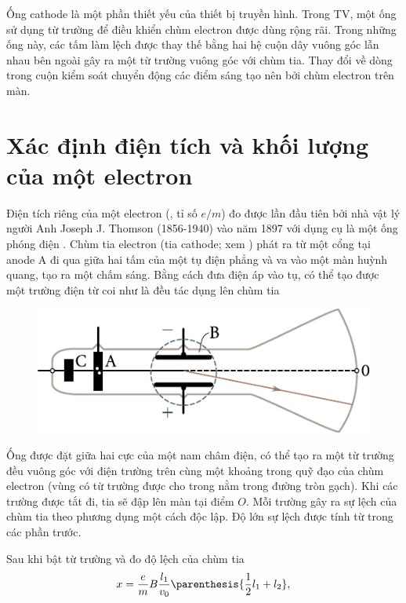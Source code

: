 Ống cathode là một phần thiết yếu của thiết bị truyền hình.
Trong TV, một ống sử dụng từ trường để điều khiển chùm electron được dùng rộng rãi.
Trong những ống này, các tấm làm lệch được thay thế bằng hai hệ cuộn dây vuông góc lẫn nhau bên ngoài gây ra một từ trường vuông góc với chùm tia.
Thay đổi về dòng trong cuộn kiểm soát chuyển động các điểm sáng tạo nên bởi chùm electron trên màn.

\section{Xác định điện tích và khối lượng
của một electron}\label{sec:10_3}

Điện tích riêng của một electron (\ie, tỉ số $e/m$) đo được lần đầu tiên bởi nhà vật lý người Anh Joseph J. Thomson (1856-1940) vào năm 1897 với dụng cụ là một ống phóng điện .
Chùm tia electron (tia cathode; xem ) phát ra từ một cổng tại anode A đi qua giữa hai tấm của một tụ điện phẳng và va vào một màn huỳnh quang, tạo ra một chấm sáng.
Bằng cách đưa điện áp vào tụ, có thể tạo được một trường điện từ coi như là đều tác dụng lên chùm tia

\begin{figure}[t]
	\begin{center}
		\includegraphics[scale=1]{figures/ch_10/fig_10_6.pdf}
		\caption[]{}
		\label{fig:10_6}
	\end{center}
	\vspace{-0.8cm}
\end{figure}

Ống được đặt giữa hai cực của một nam châm điện, có thể tạo ra một từ trường đều vuông góc với điện trường trên cùng một khoảng trong quỹ đạo của chùm electron (vùng có từ trường được cho trong  nằm trong đường tròn gạch).
Khi các trường được tắt đi, tia sẽ đập lên màn tại điểm $O$.
Mỗi trường gây ra sự lệch của chùm tia theo phương dụng một cách độc lập.
Độ lớn sự lệch được tính từ  trong các phần trước.

Sau khi bật từ trường và đo độ lệch của chùm tia
\begin{equation}\label{eq:10_10}
    x = \frac{e}{m} B \frac{l_1}{v_0} \parenthesis{\frac{1}{2} l_1 + l_2},
\end{equation}

